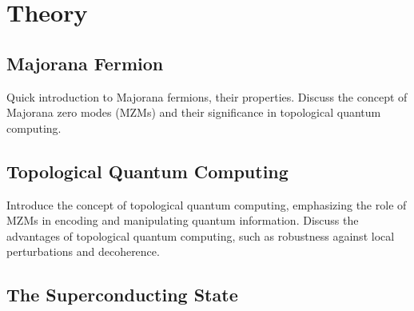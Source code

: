 \section{Theory}
\subsection{Majorana Fermion}
{\color{red}
Quick introduction to Majorana fermions, their properties. Discuss the concept of Majorana zero modes (MZMs) and their significance in topological quantum computing.
}
\subsection{Topological Quantum Computing}
{\color{red}
Introduce the concept of topological quantum computing, emphasizing the role of MZMs in encoding and manipulating quantum information. Discuss the advantages of topological quantum computing, such as robustness against local perturbations and decoherence.
}

\subsection{The Superconducting State}
